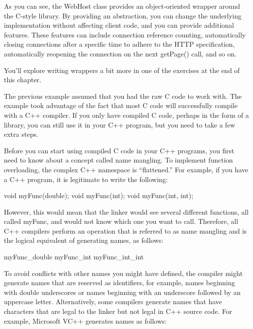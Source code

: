 As you can see, the WebHost class provides an object-oriented wrapper around the C-style library. By providing an abstraction, you can change the underlying implementation without affecting client code, and you can provide additional features. These features can include connection reference counting, automatically closing connections after a specific time to adhere to the HTTP specification, automatically reopening the connection on the next getPage() call, and so on.

You’ll explore writing wrappers a bit more in one of the exercises at the end of this chapter.


The previous example assumed that you had the raw C code to work with. The example took advantage of the fact that most C code will successfully compile with a C++ compiler. If you only have compiled C code, perhaps in the form of a library, you can still use it in your C++ program, but you need to take a few extra steps.

Before you can start using compiled C code in your C++ programs, you first need to know about a concept called name mangling. To implement function overloading, the complex C++ namespace is “flattened.” For example, if you have a C++ program, it is legitimate to write the following:

\begin{cpp}
void myFunc(double);
void myFunc(int);
void myFunc(int, int);
\end{cpp}

However, this would mean that the linker would see several different functions, all called myFunc, and would not know which one you want to call. Therefore, all C++ compilers perform an operation that is referred to as name mangling and is the logical equivalent of generating names, as follows:

\begin{shell}
myFunc_double
myFunc_int
myFunc_int_int
\end{shell}

To avoid conflicts with other names you might have defined, the compiler might generate names that are reserved as identifiers, for example, names beginning with double underscores or names beginning with an underscore followed by an uppercase letter. Alternatively, some compilers generate names that have characters that are legal to the linker but not legal in C++ source code. For example, Microsoft VC++ generates names as follows:

